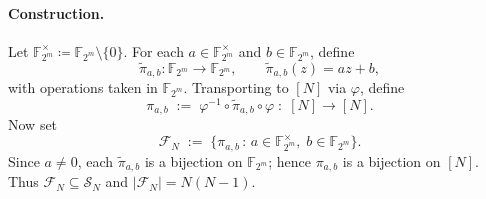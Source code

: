 \documentclass[journal]{IEEEtran}
\theoremstyle{definition}
\theoremstyle{definition}
\begin{document}
\paragraph{Construction.}
Let \(\mathbb{F}_{2^{m}}^{\times}\coloneqq \mathbb{F}_{2^{m}}\setminus\{0\}\).
For each \(a\in\mathbb{F}_{2^{m}}^{\times}\) and \(b\in\mathbb{F}_{2^{m}}\), define
\[
\widetilde{\pi}_{a,b}:\mathbb{F}_{2^{m}}\to \mathbb{F}_{2^{m}},\qquad
\widetilde{\pi}_{a,b}(z)=az+b,
\]
with operations taken in \(\mathbb{F}_{2^{m}}\).
Transporting to \([N]\) via \(\varphi\), define
\[
\pi_{a,b}\;:=\;\varphi^{-1}\circ \widetilde{\pi}_{a,b}\circ \varphi \;:\; [N]\to [N].
\]
Now set
\[
\mathcal{F}_N \;:=\; \{\pi_{a,b}\,:\, a\in \mathbb{F}_{2^{m}}^{\times},\; b\in \mathbb{F}_{2^{m}}\}.
\]
Since \(a\neq 0\), each \(\widetilde{\pi}_{a,b}\) is a bijection on \(\mathbb{F}_{2^{m}}\); hence \(\pi_{a,b}\) is a bijection on \([N]\).
Thus \(\mathcal{F}_N\subseteq \mathcal{S}_N\) and \(|\mathcal{F}_N|=N(N-1)\).
\end{document}
